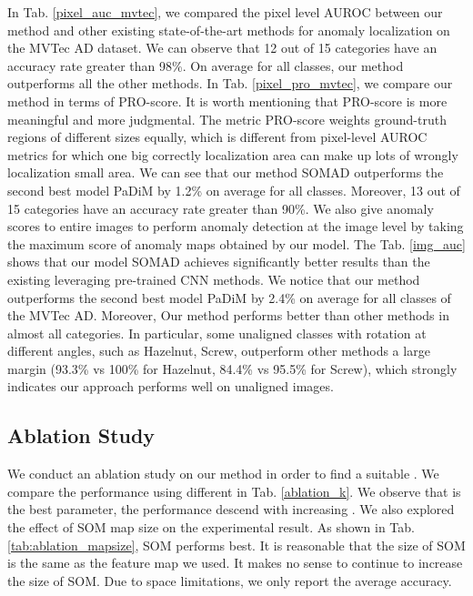 \documentclass{article}
\begin{document}
In Tab. \ref{pixel_auc_mvtec}, we compared the pixel level AUROC between our method and other existing state-of-the-art methods for anomaly localization on the MVTec AD dataset. We can observe that 12 out of 15 categories have an accuracy rate greater than 98\%. On average for all classes, our method outperforms all the other methods.
In Tab. \ref{pixel_pro_mvtec}, we compare our method in terms of PRO-score. It is worth mentioning that PRO-score is more meaningful and more judgmental. The metric PRO-score weights ground-truth regions of different sizes equally, which is different from pixel-level AUROC metrics for which one big correctly localization area can make up lots of wrongly localization small area. We can see that our method SOMAD outperforms the second best model PaDiM \cite{Padim} by 1.2\% on average for all classes. Moreover, 13 out of 15 categories have an accuracy rate greater than 90\%.
We also give anomaly scores to entire images to perform anomaly detection at the image level by taking the maximum score of anomaly maps obtained by our model. The Tab. \ref{img_auc} shows that our model SOMAD achieves significantly better results than the existing leveraging pre-trained CNN methods. We notice that our method outperforms the second best model PaDiM \cite{Padim} by 2.4\% on average for all classes of the MVTec AD. Moreover, Our method performs better than other methods in almost all categories.
In particular, some unaligned classes with rotation at different angles, such as Hazelnut, Screw, outperform other methods a large margin (93.3\% vs 100\% for Hazelnut, 84.4\% vs 95.5\% for Screw),  which strongly indicates our approach performs well on unaligned images. 

\subsection{Ablation Study}
\label{ablation study}
We conduct an ablation study on our method in order to find a suitable . We compare the performance using different  in Tab. \ref{ablation_k}. We observe that  is the best parameter, the performance descend with increasing . We also explored the effect of SOM map size on the experimental result. As shown in Tab. \ref{tab:ablation_mapsize},  SOM performs best. It is reasonable that the size of SOM is the same as the feature map we used. It makes no sense to continue to increase the size of SOM. Due to space limitations, we only report the average accuracy.
\end{document}
